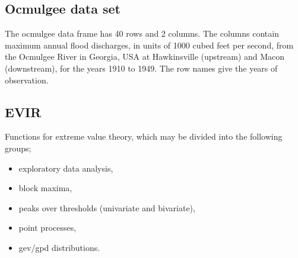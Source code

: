 \subsection{Ocmulgee data set}

The ocmulgee data frame has 40 rows and 2 columns.
The columns contain maximum annual flood discharges, in units of 1000 cubed feet per second, from the Ocmulgee River in Georgia, USA at Hawkinsville (upstream) and Macon (downstream), for the years 1910 to 1949. The row names give the years of observation.

\subsection{EVIR}

Functions for extreme value theory, which may be divided into the following groups;
\begin{itemize}
\item exploratory data analysis,
\item block maxima,
\item peaks over thresholds (univariate and bivariate),
\item point processes,
\item gev/gpd distributions.
\end{itemize}